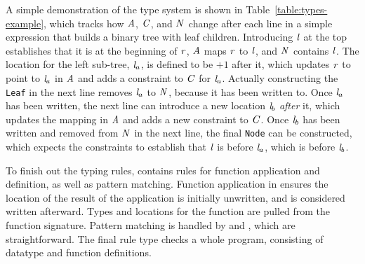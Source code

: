 \documentclass[showabstract,showacknowledgments,showpreface,showdedication]{iuphd}
\theoremstyle{nonumberplain}
\begin{document}
{A simple demonstration of the type system is shown in
Table~\ref{table:types-example}, which tracks how $\mathit{A}$, $\mathit{C}$,
and $\mathit{N}$
change after each line in a simple expression that builds
a binary tree with leaf children. Introducing $\mathit{l}$ at the top
establishes that it is at the beginning of $\mathit{r}$,
$\mathit{A}$ maps $\mathit{r}$ to $\mathit{l}$, and $\mathit{N}$ contains $\mathit{l}$.
The location for the left sub-tree,
$\mathit{l}_a$, is defined to be $+ 1$ after it, which updates $\mathit{r}$ to
point to $\mathit{l}_a$ in $\mathit{A}$ and adds a constraint to $\mathit{C}$ for
$\mathit{l}_a$. Actually constructing the \texttt{Leaf} in the next line
removes $\mathit{l}_a$ to $\mathit{N}$, because it has been written to. Once $\mathit{l}_a$
has been written, the next line can introduce a new location $\mathit{l}_b$
\emph{after} it, which updates the mapping in $\mathit{A}$ and adds a
new constraint to $\mathit{C}$. Once $\mathit{l}_b$ has been written and removed
from $\mathit{N}$ in the next line, the final \texttt{Node} can be constructed,
which expects the constraints to establish that $\mathit{l}$ is before $\mathit{l}_a$,
which is before $\mathit{l}_b$.}





To finish out the typing rules,  contains rules for
function application and definition, as well as pattern matching.
%
Function application in \textsc{\tapp} ensures the location of the result of
the application is initially unwritten, and is considered written afterward.
%
Types and locations for the function are pulled from the function signature.
%
Pattern matching is handled by \textsc{\tcase} and \textsc{\tpat}, which
are straightforward.
%
The final rule type checks a whole program, consisting of datatype
and function definitions.
\end{document}

